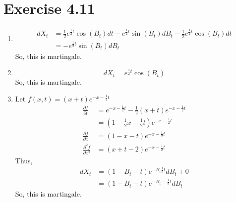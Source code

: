 \documentclass{article}
\begin{document}
\section*{Exercise 4.11}
	\begin{enumerate}
		\item \begin{align*}
			dX_t
			& = \frac{1}{2}e^{\frac{1}{2}t}\cos{(B_t)}dt - e^{\frac{1}{2}t}\sin{(B_t)}dB_t - \frac{1}{2}e^{\frac{1}{2}t}\cos{(B_t)}dt\\
			& = -e^{\frac{1}{2}t}\sin{(B_t)}dB_t
		\end{align*}
		So, this is martingale.
		\item $$dX_t = e^{\frac{1}{2}t}\cos{(B_t)}$$
		So, this is martingale.
		\item Let $f(x,t) = (x+t)e^{-x-\frac{1}{2}t}$
		\begin{align*}
			\frac{\partial f}{\partial t}
			& = e^{-x-\frac{1}{2}t} - \frac{1}{2}(x+t)e^{-x-\frac{1}{2}t}\\
			& = \left(1-\frac{1}{2}x - \frac{1}{2}t\right)e^{-x-\frac{1}{2}t}\\
			\frac{\partial f}{\partial x}
			& = \left(1-x-t\right)e^{-x-\frac{1}{2}t}\\
			\frac{\partial^2 f}{\partial x^2}
			& = \left(x+t-2\right)e^{-x-\frac{1}{2}t}
		\end{align*}
		Thus, \begin{align*}
			dX_t
			& = \left(1-B_t-t\right)e^{-B_t\frac{1}{2}t}dB_t + 0\\
			& = \left(1-B_t - t\right)e^{-B_t-\frac{1}{2}t}dB_t
		\end{align*}
		So, this is martingale.
	\end{enumerate}
\end{document}
